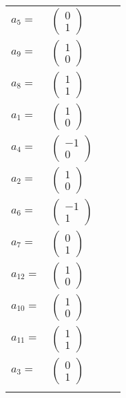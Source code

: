 \documentclass[1p]{elsarticle_modified}
\theoremstyle{definition}
\begin{document}
\begin{tabular}{m{7pt} m{180pt} m{7pt} m{180pt} }
\flushright $a_{5}=$&$\begin{pmatrix}0\\1\end{pmatrix}$ \\
\flushright $a_{9}=$&$\begin{pmatrix}1\\0\end{pmatrix}$ \\
\flushright $a_{8}=$&$\begin{pmatrix}1\\1\end{pmatrix}$ \\
\flushright $a_{1}=$&$\begin{pmatrix}1\\0\end{pmatrix}$ \\
\flushright $a_{4}=$&$\begin{pmatrix}-1\\0\end{pmatrix}$ \\
\flushright $a_{2}=$&$\begin{pmatrix}1\\0\end{pmatrix}$ \\
\flushright $a_{6}=$&$\begin{pmatrix}-1\\1\end{pmatrix}$ \\
\flushright $a_{7}=$&$\begin{pmatrix}0\\1\end{pmatrix}$ \\
\flushright $a_{12}=$&$\begin{pmatrix}1\\0\end{pmatrix}$ \\
\flushright $a_{10}=$&$\begin{pmatrix}1\\0\end{pmatrix}$ \\
\flushright $a_{11}=$&$\begin{pmatrix}1\\1\end{pmatrix}$ \\
\flushright $a_{3}=$&$\begin{pmatrix}0\\1\end{pmatrix}$\\&\end{tabular}
\end{document}
